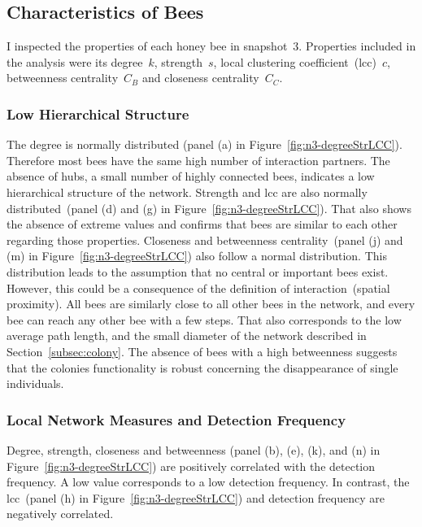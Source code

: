 \subsection{Characteristics of Bees}
\label{subsubsec:bees}
I inspected the properties of each honey bee in snapshot~3.
Properties included in the analysis were its degree~$k$, strength~$s$, local clustering coefficient~(lcc)~$c$, betweenness centrality~$C_B$ and closeness centrality~$C_C$.

\subsubsection{Low Hierarchical Structure}
The degree is normally distributed (panel (a) in Figure~\ref{fig:n3-degreeStrLCC}).
Therefore most bees have the same high number of interaction partners.
The absence of hubs, a small number of highly connected bees, indicates a low hierarchical structure of the network.
Strength and lcc are also normally distributed~(panel (d) and (g) in Figure~\ref{fig:n3-degreeStrLCC}).
That also shows the absence of extreme values and confirms that bees are similar to each other regarding those properties.
Closeness and betweenness centrality~(panel (j) and (m) in Figure~\ref{fig:n3-degreeStrLCC}) also follow a normal distribution.
This distribution leads to the assumption that no central or important bees exist. However, this could be a consequence of the definition of interaction~(spatial proximity).
All bees are similarly close to all other bees in the network, and every bee can reach any other bee with a few steps.
That also corresponds to the low average path length, and the small diameter of the network described in Section~\ref{subsec:colony}.
The absence of bees with a high betweenness suggests that the colonies functionality is robust concerning the disappearance of single individuals.

\subsubsection{Local Network Measures and Detection Frequency}
Degree, strength, closeness and betweenness (panel (b), (e), (k), and (n) in Figure~\ref{fig:n3-degreeStrLCC}) are positively correlated with the detection frequency. A low value corresponds to a low detection frequency. In contrast, the lcc~(panel (h) in Figure~\ref{fig:n3-degreeStrLCC}) and detection frequency are negatively correlated.

